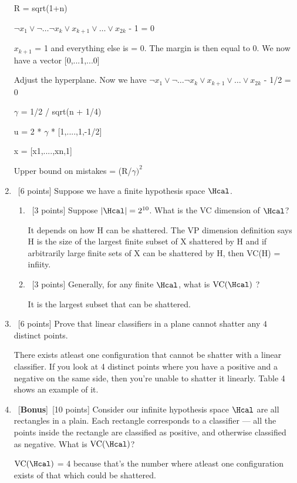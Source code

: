 \documentclass[12pt, fullpage,letterpaper]{article}
\begin{document}
\begin{enumerate}
	R = sqrt(1+n)

	$ \neg x_1 \lor \neg \ldots \neg x_k \lor x_{k+1} \lor \ldots \lor x_{2k}$ - 1 = 0
	
	$ x_{k+1}$ = 1 and everything else is = 0. The margin is then equal to 0. We now have a vector [0,...1,...0]

	Adjust the hyperplane. Now we have $ \neg x_1 \lor \neg \ldots \neg x_k \lor x_{k+1} \lor \ldots \lor x_{2k}$ - 1/2 = 0

	$\gamma$ = 1/2 / sqrt(n + 1/4)

	u = 2 * $\gamma$ * [1,....,1,-1/2]

	x = [x1,....,xn,1]

	Upper bound on mistakes = (R/$\gamma)^2$
	
	\item~[6 points] Suppose we have a finite hypothesis space $\Hcal$.
	\begin{enumerate}
		\item~[3 points] Suppose $|\Hcal| = 2^{10}$. What is the VC dimension of $\Hcal$? \newline

		It depends on how H can be shattered. The VP dimension definition says H is the size of the largest finite subset of X shattered by H and if arbitrarily large finite sets of X can be shattered by H, then VC(H) = infiity.


		\item~[3 points] Generally, for  any finite $\Hcal$, what is $\mathrm{VC}(\Hcal)$ ? \newline

		It is the largest subset that can be shattered. 



	\end{enumerate}
	\item~[6 points] Prove that linear classifiers in a plane cannot shatter any $4$ distinct points. \newline

	There exists atleast one configuration that cannot be shatter with a linear classifier. If you look at 4 distinct points where you have a positive and a negative on the same side, then you're unable to shatter it linearly. Table 4 shows an example of it. 

	
	\item~[\textbf{Bonus}]~[10 points] Consider our infinite hypothesis space $\Hcal$ are all rectangles in a plain. Each rectangle corresponds to a classifier --- all the points inside the rectangle are classified as positive, and otherwise classified as negative. What is $\mathrm{VC}(\Hcal)$? \newline

 $\mathrm{VC}(\Hcal)$ = 4 because that's the number where atleast one configuration exists of that which could be shattered. 



\end{enumerate}
\end{document}
